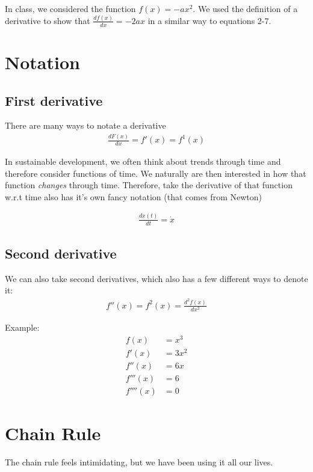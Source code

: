 \documentclass{article}
\begin{document}
In class, we considered the function $f(x) = -ax^2$. We used the  definition of a derivative to show that $\frac{df(x)}{dx} = -2ax$ in a similar way to equations 2-7.

\section{Notation}
\subsection{First derivative}

There are many ways to notate a derivative
\begin{align}
    \frac{dF(x)}{dx} = f'(x) = f^1(x)
\end{align}

In sustainable development, we often think about trends through time and therefore consider functions of time. We naturally are then interested in how that function \textit{changes} through time. Therefore, take the derivative of that function w.r.t time also has it's own fancy notation (that comes from Newton)

\begin{align}
    \frac{d x(t)}{dt} = \dot x
\end{align}

\subsection{Second derivative}

We can also take second derivatives, which also has a few different ways to denote it:
\begin{align}
    f''(x) = f^2(x) = \frac{d^2 f(x)}{dx^2}
\end{align}

Example: 
\begin{align*}
    f(x) &= x^3\\
    f'(x) &= 3x^2\\
    f''(x) &= 6x\\
    f'''(x) &= 6\\
    f''''(x) &= 0
\end{align*}

\section{Chain Rule}
The chain rule feels intimidating, but we have been using it all our lives. \\
\end{document}
